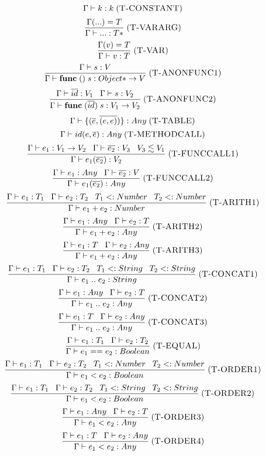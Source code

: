 \documentclass[12pt]{article}
\newcommand{\mylabel}[1]{\; (\textsc{#1})}
\newcommand{\subtype}{<:}
\newcommand{\env}{\Gamma}
\begin{document}
\[
\env \vdash k : k
\mylabel{T-CONSTANT}
\]
\[
\frac{\env({...}) = T}
     {\env \vdash {...} : T*}
\mylabel{T-VARARG}
\]
\[
\frac{\env(v) = T}
     {\env \vdash v : T}
\mylabel{T-VAR}
\]
\[
\frac{\env \vdash s:V}
     {\env \vdash \mathbf{func} \; () \; s : {Object*} \rightarrow V}
\mylabel{T-ANONFUNC1}
\]
\[
\frac{\env \vdash \overline{id}:V_{1} \;\;\; \env \vdash s:V_{2}}
     {\env \vdash \mathbf{func} \; (\overline{id}) \; s :
     {V_{1}} \rightarrow V_{2}}
\mylabel{T-ANONFUNC2}
\]
\[
\env \vdash \{(\overline{e},\overline{(e,e)})\} : Any
\mylabel{T-TABLE}
\]
\[
\env \vdash id(e,\overline{e}) : Any
\mylabel{T-METHODCALL}
\]
\[
\frac{\env \vdash e_{1}:V_{1} \rightarrow V_{2} \;\;\;
      \env \vdash \overline{e_{2}}:V_{3} \;\;\; V_{3} \lesssim V_{1}}
     {\env \vdash e_{1}(\overline{e_{2}}) : V_{2}}
\mylabel{T-FUNCCALL1}
\]
\[
\frac{\env \vdash e_{1}:Any \;\;\; \env \vdash \overline{e_{2}}:V}
     {\env \vdash e_{1}(\overline{e_{2}}) : Any}
\mylabel{T-FUNCCALL2}
\]
\[
\frac{\env \vdash e_{1}:T_{1} \;\;\; \env \vdash e_{2}:T_{2} \;\;\;
      T_{1} \subtype Number \;\;\; T_{2} \subtype Number}
     {\env \vdash e_{1} + e_{2} : Number}
\mylabel{T-ARITH1}
\]
\[
\frac{\env \vdash e_{1}:Any \;\;\; \env \vdash e_{2}:T}
     {\env \vdash e_{1} + e_{2} : Any}
\mylabel{T-ARITH2}
\]
\[
\frac{\env \vdash e_{1}:T \;\;\; \env \vdash e_{2}:Any}
     {\env \vdash e_{1} + e_{2} : Any}
\mylabel{T-ARITH3}
\]
\[
\frac{\env \vdash e_{1}:T_{1} \;\;\; \env \vdash e_{2}:T_{2} \;\;\;
      T_{1} \subtype String \;\;\; T_{2} \subtype String}
     {\env \vdash e_{1} \; {..} \;  e_{2} : String}
\mylabel{T-CONCAT1}
\]
\[
\frac{\env \vdash e_{1}:Any \;\;\; \env \vdash e_{2}:T}
     {\env \vdash e_{1} \; {..} \; e_{2} : Any}
\mylabel{T-CONCAT2}
\]
\[
\frac{\env \vdash e_{1}:T \;\;\; \env \vdash e_{2}:Any}
     {\env \vdash e_{1} \; {..} \; e_{2} : Any}
\mylabel{T-CONCAT3}
\]
\[
\frac{\env \vdash e_{1}:T_{1} \;\;\; \env \vdash e_{2}:T_{2}}
     {\env \vdash e_{1} == e_{2} : Boolean}
\mylabel{T-EQUAL}
\]
\[
\frac{\env \vdash e_{1}:T_{1} \;\;\; \env \vdash e_{2}:T_{2} \;\;\;
      T_{1} \subtype Number \;\;\; T_{2} \subtype Number}
     {\env \vdash e_{1} < e_{2} : Boolean}
\mylabel{T-ORDER1}
\]
\[
\frac{\env \vdash e_{1}:T_{1} \;\;\; \env \vdash e_{2}:T_{2} \;\;\;
      T_{1} \subtype String \;\;\; T_{2} \subtype String}
     {\env \vdash e_{1} < e_{2} : Boolean}
\mylabel{T-ORDER2}
\]
\[
\frac{\env \vdash e_{1}:Any \;\;\; \env \vdash e_{2}:T}
     {\env \vdash e_{1} < e_{2} : Any}
\mylabel{T-ORDER3}
\]
\[
\frac{\env \vdash e_{1}:T \;\;\; \env \vdash e_{2}:Any}
     {\env \vdash e_{1} < e_{2} : Any}
\mylabel{T-ORDER4}
\]
\end{document}
